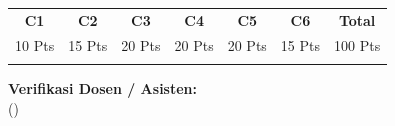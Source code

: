 \documentclass[10pt,a4paper]{article}
\begin{document}
\noindent\begin{minipage}[b]{0.65\textwidth}%
  \centering
  \scriptsize
  \begin{tabular}{|c|c|c|c|c|c|c|}
    \hline
    \rowcolor{unibblue}
    \textbf{\color{white}C1} & \textbf{\color{white}C2} & \textbf{\color{white}C3} & \textbf{\color{white}C4} & \textbf{\color{white}C5} & \textbf{\color{white}C6} & \textbf{\color{white}Total} \\
    \rowcolor{unibblue!10}
    10 Pts & 15 Pts & 20 Pts & 20 Pts & 20 Pts & 15 Pts & 100 Pts \\
    \hline
    & & & & & & \\[2.5mm]
    \hline
  \end{tabular}%
\end{minipage}%
\hfill%
\begin{minipage}[b]{0.32\textwidth}%
  \centering
  \scriptsize
  \textbf{Verifikasi Dosen / Asisten:}\\[5mm]
  (\dotfill)
\end{minipage}\par
\end{document}
